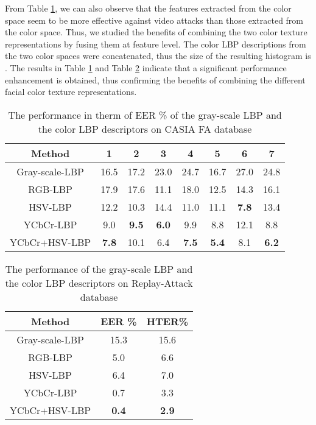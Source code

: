 \documentclass{article}
\begin{document}
From Table \ref{perf_casia}, we can also observe that the features extracted from the  color space seem to be more effective against video attacks than those extracted from the  color space. Thus,  we studied the benefits of combining the two color texture representations by fusing them at feature level. The color LBP descriptions from the two color spaces were concatenated, thus the size of the resulting histogram is . The results in Table \ref{perf_casia} and Table \ref{perf_replay} indicate that a significant performance enhancement is obtained, thus confirming the benefits of combining the different facial color texture representations.

\vspace{-4mm}
\begin{table}[h]
\small
		\centering
	\caption{The performance in therm of EER \% of the gray-scale LBP and the color LBP descriptors on CASIA FA database}
	 \label{perf_casia}
		\setlength{\tabcolsep}{0.14cm}
		\begin{tabular}{|c|c|c|c|c|c|c|c|}
			\hline
			Method & 1 & 2& 3& 4 & 5 & 6& 7\\
			\hline \hline
			Gray-scale-LBP& 16.5& 17.2 & 23.0& 24.7 &16.7& 27.0 &24.8\\
					\hline 
			RGB-LBP& 17.9 & 17.6 & 11.1 & 18.0& 12.5 & 14.3&16.1\\
			\hline 
			HSV-LBP& 12.2 & 10.3& 14.4 & 11.0 &11.1  & \textbf{7.8}&13.4\\
			\hline 
			YCbCr-LBP& 9.0 & \textbf{9.5 }&\textbf{6.0} & 9.9&8.8  & 12.1 &8.8 \\
			\hline
			\hline
			YCbCr+HSV-LBP& \textbf{7.8}& 10.1 &6.4 &\textbf{ 7.5} &\textbf{5.4}  & 8.1 &\textbf{6.2}\\
			\hline 			
	 \end{tabular}	
	\end{table} 	
	\vspace{-6mm}
		\begin{table}[h]
		\small
			\centering
	\caption{The performance of the gray-scale LBP and the color LBP descriptors on Replay-Attack database}
\label{perf_replay}
	\setlength{\tabcolsep}{0.7cm}
		\begin{tabular}{|c|c|c|}
			\hline
	    Method & EER \%& HTER\%\\
			\hline \hline
			Gray-scale-LBP&15.3 &15.6 \\
					\hline 
			RGB-LBP& 5.0 & 6.6 \\
			\hline 
			HSV-LBP&6.4  & 7.0 \\
			\hline 
			YCbCr-LBP&  0.7 & 3.3 \\
			\hline 
			\hline
			YCbCr+HSV-LBP&  \textbf{0.4} & \textbf{2.9} \\
			\hline
	 \end{tabular}	
	\end{table}  
	
\end{document}
